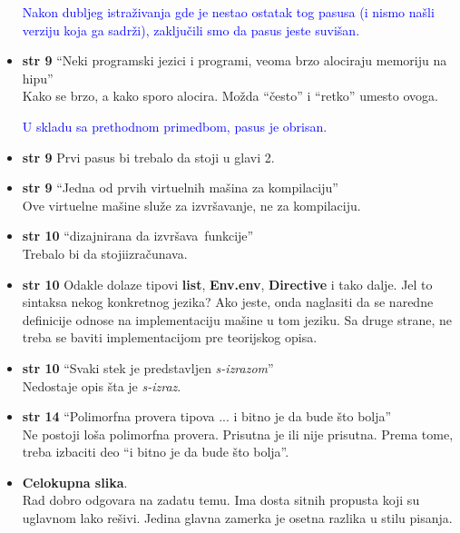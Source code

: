 \documentclass[a4paper]{report}
\newcommand{\odgovor}[1]{\textcolor{blue}{#1}}
\begin{document}
\begin{itemize}
\odgovor{Nakon dubljeg istraživanja gde je nestao ostatak tog pasusa (i nismo našli verziju koja ga sadrži), zaključili smo da pasus jeste suvišan.}

\item \textbf{str 9} ``Neki programski jezici i programi, veoma brzo alociraju memoriju na hipu'' \\ Kako se brzo, a kako sporo alocira. Možda ``često'' i ``retko'' umesto ovoga.

\odgovor{U skladu sa prethodnom primedbom, pasus je obrisan.}

\item \textbf{str 9} Prvi pasus bi trebalo da stoji u glavi 2.

\item \textbf{str 9} ``Jedna od prvih virtuelnih mašina za kompilaciju'' \\ Ove virtuelne mašine služe za izvršavanje, ne za kompilaciju.

\item \textbf{str 10} ``dizajnirana da \color{blue}izvršava\color{black}~funkcije'' \\ Trebalo bi da stoji\color{blue}izračunava\color{black}.

\item \textbf{str 10} Odakle dolaze tipovi \textbf{list}, \textbf{Env.env}, \textbf{Directive} i tako dalje. Jel to sintaksa nekog konkretnog jezika? Ako jeste, onda naglasiti da se naredne definicije odnose na implementaciju mašine u tom jeziku. Sa druge strane, ne treba se baviti implementacijom pre teorijskog opisa.

\item \textbf{str 10} ``Svaki stek je predstavljen \textit{s-izrazom}'' \\ Nedostaje opis šta je \textit{s-izraz}.

\item \textbf{str 14} ``Polimorfna provera tipova ... i bitno je da bude što bolja'' \\ Ne postoji loša polimorfna provera. Prisutna je ili nije prisutna. Prema tome, treba izbaciti deo ``i bitno je da bude što bolja''.

\item \textbf{Celokupna slika}. \\Rad dobro odgovara na zadatu temu. Ima dosta sitnih propusta koji su uglavnom lako rešivi. Jedina glavna zamerka je osetna razlika u stilu pisanja.
\end{itemize}
\end{document}
